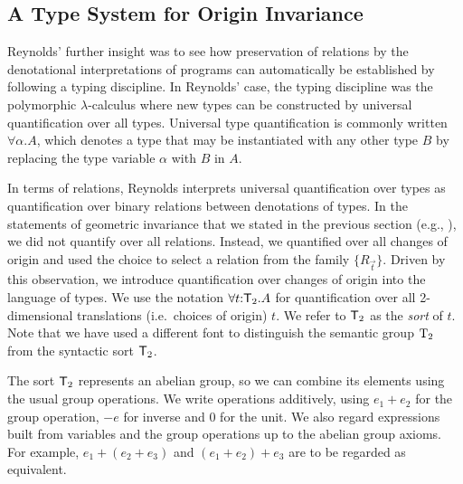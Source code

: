 
\subsection{A Type System for Origin Invariance}
\label{sec:type-system-geom-intro}

Reynolds' further insight was to see how preservation of relations by
the denotational interpretations of programs can automatically be
established by following a typing discipline. In Reynolds' case, the
typing discipline was the polymorphic $\lambda$-calculus where new
types can be constructed by universal quantification over all
types. Universal type quantification is commonly written $\forall
\alpha. A$, which denotes a type that may be instantiated with any
other type $B$ by replacing the type variable $\alpha$ with $B$ in
$A$.

In terms of relations, Reynolds interprets universal quantification
over types as quantification over binary relations between denotations
of types. In the statements of geometric invariance that we stated in
the previous section (e.g., ), we
did not quantify over all relations. Instead, we quantified over all
changes of origin and used the choice to select a relation from the
family $\{R_{\vec{t}}\}$. Driven by this observation, we introduce
quantification over changes of origin into the language of types.  We
use the notation $\forall t \mathord: \mathsf{T}_2. A$ for
quantification over all 2-dimensional translations (i.e.~choices of
origin) $t$. We refer to $\mathsf{T}_2$ as the \emph{sort} of
$t$. Note that we have used a different font to distinguish the
semantic group $\mathrm{T}_2$ from the syntactic sort $\mathsf{T}_2$.

The sort $\mathsf{T}_2$ represents an abelian group, so we can combine
its elements using the usual group operations. We write operations
additively, using $e_1 + e_2$ for the group operation, $-e$ for
inverse and $0$ for the unit.  We also regard expressions built from
variables and the group operations up to the abelian group axioms. For
example, $e_1 + (e_2 + e_3)$ and $(e_1 + e_2) + e_3$ are to be
regarded as equivalent.

